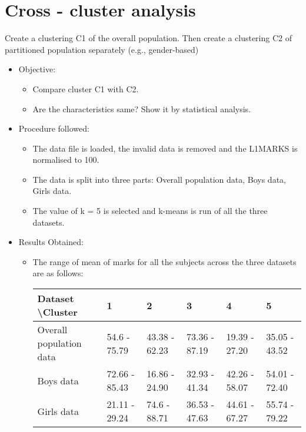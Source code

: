 \chapter{Cross - cluster analysis}
Create a clustering C1 of the overall population. Then create a clustering C2 of partitioned population separately (e.g., gender-based)
\begin{itemize}
	\item
	Objective:
	\begin{itemize}
		\item
		Compare cluster C1 with C2.
		\item
		Are the characteristics same? Show it by statistical analysis.
	\end{itemize}
	
	\item
	Procedure followed: 
	\begin{itemize}
		\item
		The data file is loaded, the invalid data is removed and the L1\textunderscore MARKS is normalised to 100.		
		\item
		The data is split into three parts: Overall population data, Boys data, Girls data.
		\item
		The value of k = 5 is selected and k-means is run of all the three datasets.
	\end{itemize}
	
	\item
	Results Obtained:
	\begin{itemize}
		\item
		The range of mean of marks for all the subjects across the three datasets are as follows:
		\begin{center}
		    \begin{tabular}{ | C{2.5cm} | C{1.5cm} | C{1.5cm} | C{1.5cm} | C{1.5cm} | C{1.5cm} |}
		    \hline
				Dataset \textbackslash  Cluster & 1 & 2 & 3 & 4 & 5 \\ \hline
				Overall population data & 54.6 - 75.79 & 43.38 - 62.23 & 73.36 - 87.19 & 19.39 - 27.20 & 35.05 - 43.52 \\ 	\hline		
				Boys data & 72.66 - 85.43 & 16.86 - 24.90 & 32.93 - 41.34 & 42.26 - 58.07 & 54.01 - 72.40 \\ 	\hline		
				Girls data & 21.11 - 29.24 & 74.6 - 88.71 & 36.53 - 47.63 & 44.61 - 67.27 & 55.74 - 79.22 \\ 	\hline									
			\end{tabular}
		\end{center}
		

\end{itemize}
\end{itemize}
